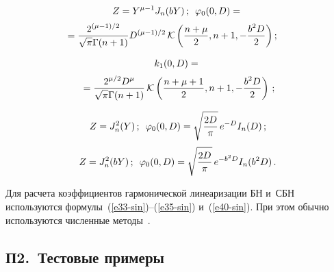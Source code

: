 \begin{multicols}{2}
{          \vspace*{-12pt}
     
     \begin{multline*}
    Z= Y^{\mu-1}J_n (bY)\,;\enskip \vrp_0 (0,D) ={}\\[2pt]
    \hspace*{-5mm}{}= \fr{2^{(\mu-1)/2}}{\sqrt{\pi} \Gamma(n+1)}D^{(\mu-1)/2}\, \mathcal{K}
     \left( \fr{n+\mu}{2} , n+1, -\fr{b^2D}{2}\right);
     \end{multline*}
     
     \vspace*{-12pt}
     
     \noindent
\begin{multline}
k_1 (0,D)={}\\[2pt]
{}= \displaystyle\frac{\displaystyle 2^{\mu/2} D^\mu\mathstrut}{\displaystyle \sqrt{\pi} \Gamma(n+1)\mathstrut}\,\mathcal{K}
\left( \displaystyle\frac{\displaystyle n+\mu+1\mathstrut}{\displaystyle 2\mathstrut} , n+1, -\displaystyle\frac{\displaystyle b^2D\mathstrut}{\displaystyle 2\mathstrut}\right)\,; 
\label{e1.5-sin}
\end{multline}

\vspace*{-9pt}

\begin{equation*}
Z= J_n^2 (Y) \,;\enskip \varphi_0 (0,D) = \sqrt{\displaystyle\frac{\displaystyle 2D\mathstrut}{\displaystyle \pi\mathstrut}}\,e^{-D} I_n (D)\,;
\end{equation*}
\begin{equation}
Z= J_n^2 (bY) \,;\enskip \varphi_0 (0,D) = \sqrt{\displaystyle\frac{\displaystyle 2D\mathstrut}{\displaystyle \pi\mathstrut}}\,e^{-b^2D} I_n (b^2D)\,.
\label{e1.7-sin}
\end{equation}

Для расчета коэффициентов гармонической линеаризации БН и~СБН используются 
формулы~(\ref{e33-sin})--(\ref{e35-sin}) и~(\ref{e40-sin}). 
При этом обычно используются численные методы~\cite{11-sin}.




\subsection*{П2.\ Тестовые примеры}


}
\end{multicols}
